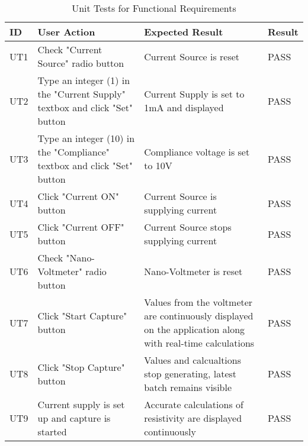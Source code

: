 \documentclass[12pt, titlepage]{article}
\begin{document}
\begin{table}[H]
	\centering
	\caption{Unit Tests for Functional Requirements}
	\label{my-label}
	\begin{tabular}{|p{0.85cm}|p{5cm}|p{5cm}|p{1.3cm}|}
		\hline
		\textbf{ID} & \textbf{User Action} & \textbf{Expected Result}  & \textbf{Result}\\ \hline
		UT1 & Check "Current Source" radio button & Current Source is reset & PASS \\ \hline
		UT2 & Type an integer (1) in the "Current Supply" textbox and click "Set" button & Current Supply is set to 1mA and displayed & PASS \\ \hline
		UT3 & Type an integer (10) in the "Compliance" textbox and click "Set" button & Compliance voltage is set to 10V & PASS\\ \hline
		UT4 & Click "Current ON" button & Current Source is supplying current & PASS \\ \hline
		UT5 & Click "Current OFF" button & Current Source stops supplying current & PASS \\ \hline
		UT6 & Check "Nano-Voltmeter" radio button & Nano-Voltmeter is reset & PASS \\ \hline
		UT7 & Click "Start Capture" button & Values from the voltmeter are continuously displayed on the application along with real-time calculations & PASS  \\ \hline
		UT8 & Click "Stop Capture" button & Values and calcualtions stop generating, latest batch remains visible & PASS \\ \hline
		UT9 & Current supply is set up and capture is started & Accurate calculations of resistivity are displayed continuously & PASS \\ \hline
	\end{tabular}
\end{table}

\end{document}
